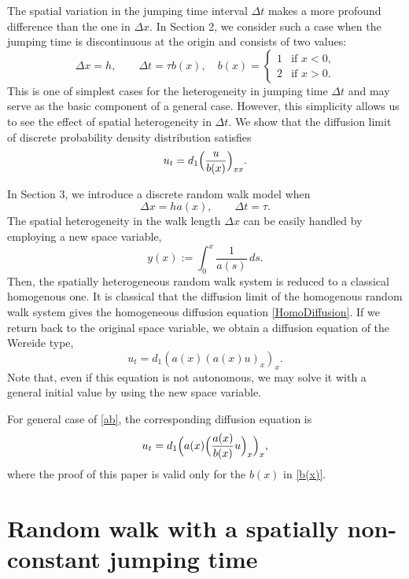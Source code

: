 \documentclass[11pt]{amsart}
\begin{document}
The spatial variation in the jumping time interval $\Delta t$ makes a more profound difference than the one in $\Delta x$. In Section 2, we consider such a case when the jumping time is discontinuous at the origin and consists of two values:
\begin{equation}\label{b(x)}
\Delta x=h,\qquad
\Delta t=\tau b(x),\quad b(x)=
\begin{cases}
1 & \text{if $x<0$,}\\
2 & \text{if $x>0$}.
\end{cases}
\end{equation}
This is one of simplest cases for the heterogeneity in jumping time $\Delta t$ and may serve as the basic component of a general case. However, this simplicity allows us to see the effect of spatial heterogeneity in $\Delta t$. We show that the diffusion limit of discrete probability density distribution satisfies
\begin{equation}\label{ux1}
u_t=d_1\Big({u\over b(x)}\Big)_{xx}.
\end{equation}


In Section 3, we introduce a discrete random walk model when
$$
 \Delta x=ha(x),\qquad\Delta t=\tau.
$$
The spatial heterogeneity in the walk length $\Delta x$ can be easily handled by employing a new space variable,
$$
y(x):=\int_0^x \frac{1}{a(s)}\,ds.
$$
Then, the spatially heterogeneous random walk system is reduced to a classical homogenous one. It is classical that the diffusion limit of the homogenous random walk system gives the homogeneous diffusion equation \eqref{HomoDiffusion}. If we return back to the original space variable, we obtain a diffusion equation of the Wereide type,
$$
u_t=d_1(a(x)(a(x)u)_x)_x.
$$
Note that, even if this equation is not autonomous, we may solve it with a general initial value by using the new space variable.

For general case of \eqref{ab}, the corresponding diffusion equation is
\begin{equation}\label{FullDiffusion}
u_t=d_1\Big(a(x)\Big({a(x)\over b(x)}u\Big)_{x}\Big)_{x},
\end{equation}
where the proof of this paper is valid only for the $b(x)$ in \eqref{b(x)}.

\newpage

\section{Random walk with a spatially non-constant jumping time}
\end{document}
